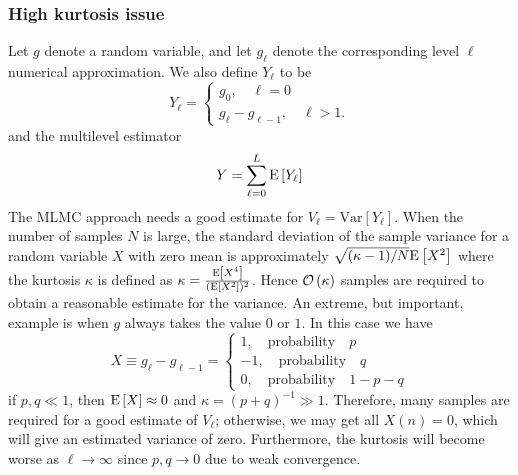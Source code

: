 \subsubsection{High kurtosis issue}\label{sec:General motivation}
Let $g$ denote a random variable, and let $g_{\ell}$ denote the corresponding level $\ell$ numerical approximation. We also define $Y_{\ell}$ to be
\[
 Y_{\ell}=\begin{cases}
               g_0,\quad \ell=0\\
               g_{\ell}-g_{\ell-1},\quad \ell>1.
            \end{cases}
\]
and the multilevel estimator 
\begin{equation}
Y=\sum_{\ell=0}^L \mathrm{E}\left[Y_{\ell}\right]
\end{equation}
The MLMC approach needs a good estimate for $V_{\ell}=\text{Var}[Y_{\ell}]$. When the number of samples $N$ is large, the standard deviation of the sample variance for a random variable $X$ with zero mean is approximately $\sqrt{(\kappa-1)/N} \mathrm{E}\left[X^2\right]$ where the kurtosis $\kappa$ is defined as $\kappa = \frac{\mathrm{E}\left[X^4\right]}{(\mathrm{E}\left[X^2\right])^2}$. Hence ${\mathcal{O}}\left(\kappa\right)$ samples are required to obtain a reasonable estimate for the variance.  An extreme, but important, example is when $g$ always takes the value $0$ or $1$. In this case we have
\[
X \equiv g_{\ell}-g_{\ell-1}=\begin{cases}
               1,\quad \text{probability} \quad p\\
               -1,\quad \text{probability}\quad q\\
               0,\quad \text{probability} \quad 1-p-q
            \end{cases}
\]
if $p,q \ll 1$, then $\mathrm{E}\left[X\right] \approx0$  and $\kappa=(p+q)^{-1}\gg 1$. Therefore, many samples are required for a good estimate of $V_{\ell}$; otherwise, we may get all $X(n)=0$, which will give an estimated variance of zero. Furthermore, the kurtosis will become worse as $\ell \rightarrow \infty$ since $p,q \rightarrow0$ due to weak convergence.


